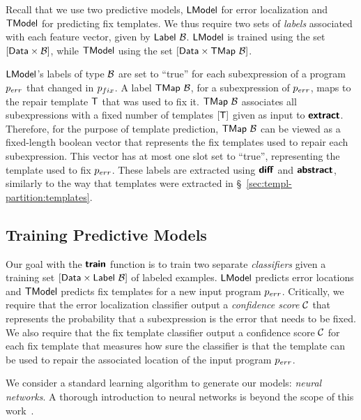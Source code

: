 Recall that we use two predictive models, $\mathsf{LModel}$ for error localization and
$\mathsf{TModel}$ for predicting fix templates. We thus require two sets of
\emph{labels} associated with each feature vector, given by
$\mathsf{Label}\ \mathcal{B}$. $\mathsf{LModel}$ is trained using the set $[\mathsf{Data} \times
\mathcal{B}]$, while $\mathsf{TModel}$ using the set $[\mathsf{Data} \times
\mathsf{TMap}\ \mathcal{B}]$.

$\mathsf{LModel}$'s labels of type $\mathcal{B}$ are set to ``true'' for each subexpression
of a program $p_{err}$ that changed in $p_{fix}$. A label $\mathsf{TMap}\ \mathcal{B}$, for a
subexpression of $p_{err}$, maps to the repair template $\mathsf{T}$ that was used to fix
it. $\mathsf{TMap}\ \mathcal{B}$ associates all subexpressions with a fixed number of
templates $[\mathsf{T}]$ given as input to $\bm{\mathsf{extract}}$. Therefore, for the
purpose of template prediction, $\mathsf{TMap}\ \mathcal{B}$ can be viewed as a
fixed-length boolean vector that represents the fix templates used to repair
each subexpression. This vector has at most one slot set to ``true'',
representing the template used to fix $p_{err}$. These labels are extracted using
$\bm{\mathsf{diff}}$ and $\bm{\mathsf{abstract}}$, similarly to the way that templates were extracted
in \S~\ref{sec:templ-partition:templates}.


\subsection{Training Predictive Models}
\label{sec:templ-pred:train}
\lstDeleteShortInline{|}

Our goal with the $\bm{\mathsf{train}}$ function is to train two separate
\emph{classifiers} given a training set $[\mathsf{Data} \times
\mathsf{Label}\ \mathcal{B}]$ of labeled examples. $\mathsf{LModel}$ predicts error locations and
$\mathsf{TModel}$ predicts fix templates for a new input program $p_{err}$. Critically, we
require that the error localization classifier output a \emph{confidence score}
$\mathcal{C}$ that represents the probability that a subexpression is the error that
needs to be fixed. We also require that the fix template classifier output a
confidence score $\mathcal{C}$ for each fix template that measures
how sure the classifier is that the template can be used to repair the
associated location of the input program $p_{err}$.

We consider a standard learning algorithm to generate our models: \emph{neural
networks}. A thorough introduction to neural networks is
beyond the scope of this work~\citep{Hastie2009-bn,Nielsen2015-pu}.

